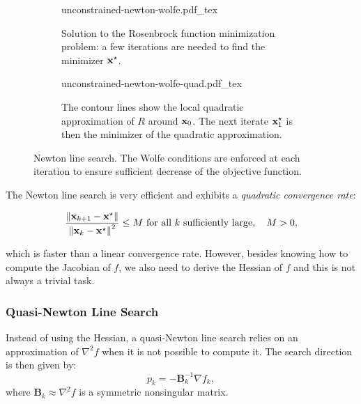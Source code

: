 \begin{figure}
  \setlength{\belowcaptionskip}{\baselineskip}
  \centering
  \begin{subfigure}{0.8\columnwidth}
    \centering
        {\def\svgwidth{\linewidth}
          {\footnotesize
            
                       {unconstrained-newton-wolfe.pdf_tex}
          }
        }
        \caption{Solution to the Rosenbrock function minimization
          problem: a few iterations are needed to find the minimizer
          $\mathbf{x}^{\star}$.}
        \label{fig:chap3-unconstrained-newton-wolfe-a}
  \end{subfigure}
  \begin{subfigure}{0.8\columnwidth}
    \centering
        {\def\svgwidth{\linewidth}
          {\footnotesize
            
                       {unconstrained-newton-wolfe-quad.pdf_tex}
          }
        }
        \caption{The contour lines show the local quadratic
          approximation of $R$ around $\mathbf{x}_0$. The next iterate
          $\mathbf{x}^{\star}_1$ is then the minimizer of the quadratic
          approximation.}
        \label{fig:chap3-unconstrained-newton-wolfe-quad}
  \end{subfigure}
  \caption{Newton line search. The Wolfe conditions are enforced at
    each iteration to ensure sufficient decrease of the objective
    function.}
  \label{fig:chap3-unconstrained-newton-wolfe}
\end{figure}

The Newton line search is very efficient and exhibits a
\emph{quadratic convergence rate}:

\begin{equation}
\frac{\left\lVert \mathbf{x}_{k+1}-\mathbf{x}^{\star} \right\rVert}{\left\lVert \mathbf{x}_k-\mathbf{x}^{\star} \right\rVert^2}
\le M \text{ for all } k \text{ sufficiently large}, \quad M>0,
\end{equation}

which is faster than a linear convergence rate. However, besides
knowing how to compute the Jacobian of $f$, we also need to derive the
Hessian of $f$ and this is not always a trivial task.

\subsubsection{Quasi-Newton Line Search}
\label{subsubsec:chap3-quasi-newton-line-search}

Instead of using the Hessian, a quasi-Newton line search relies on an
approximation of $\nabla^2 f$ when it is not possible to compute
it. The search direction is then given by:
\begin{equation}
p_k=-\mathbf{B}_k^{-1}\nabla f_k,
\end{equation}
where $\mathbf{B}_k\approx\nabla^2 f$ is a symmetric nonsingular
matrix.

